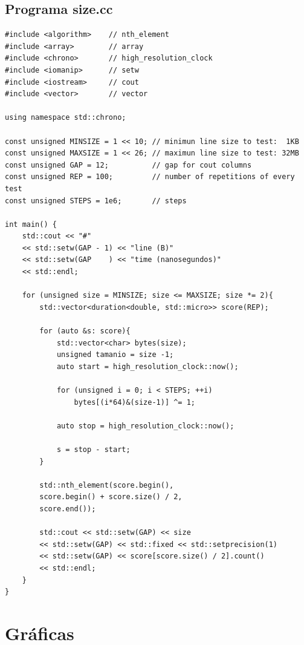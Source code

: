 	\subsection{Programa size.cc}
	
	\lstset{language=C}
	\begin{lstlisting}[frame=single]
#include <algorithm>    // nth_element
#include <array>        // array
#include <chrono>       // high_resolution_clock
#include <iomanip>      // setw
#include <iostream>     // cout
#include <vector>       // vector

using namespace std::chrono;

const unsigned MINSIZE = 1 << 10; // minimun line size to test:  1KB
const unsigned MAXSIZE = 1 << 26; // maximun line size to test: 32MB
const unsigned GAP = 12;          // gap for cout columns
const unsigned REP = 100;         // number of repetitions of every test
const unsigned STEPS = 1e6;       // steps

int main() {
	std::cout << "#" 
	<< std::setw(GAP - 1) << "line (B)"
	<< std::setw(GAP    ) << "time (nanosegundos)"
	<< std::endl;
	
	for (unsigned size = MINSIZE; size <= MAXSIZE; size *= 2){
		std::vector<duration<double, std::micro>> score(REP);
		
		for (auto &s: score){
			std::vector<char> bytes(size);
			unsigned tamanio = size -1;
			auto start = high_resolution_clock::now();
			
			for (unsigned i = 0; i < STEPS; ++i)
				bytes[(i*64)&(size-1)] ^= 1;
			
			auto stop = high_resolution_clock::now();
			
			s = stop - start;
		}
		
		std::nth_element(score.begin(), 
		score.begin() + score.size() / 2, 
		score.end());
		
		std::cout << std::setw(GAP) << size
		<< std::setw(GAP) << std::fixed << std::setprecision(1)
		<< std::setw(GAP) << score[score.size() / 2].count()
		<< std::endl;
	}
}
	\end{lstlisting}
	
	\section[Gráficas]{Gráficas}
	
